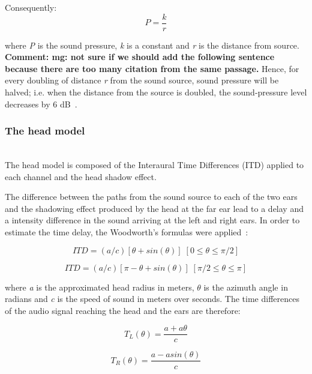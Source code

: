 \documentclass[journal]{IEEEtran}
\begin{document}
Consequently:
\begin{equation}\label{eq:soundpressure}
P = \frac{k}{r}
\end{equation}

where \textit{P} is the sound pressure, \textit{k} is a constant and \textit{r} is the distance from source.\\

\textbf{Comment: mg: not sure if we should add the following sentence because there are too many citation from the same passage.}
Hence, for every doubling of distance \textit{r} from the sound source, sound pressure will be halved; i.e. when the distance from the source is doubled, the sound-pressure level decreases by 6 dB~\cite{everest2009master}.

\subsubsection{The head model}~\\
The head model is composed of the Interaural Time Differences (ITD) applied to each channel and the head shadow effect.

The difference between the paths from the sound source to each of the two ears and the shadowing effect produced by the head at the far ear lead to a delay and a intensity difference in the sound arriving at the left and right ears.
In order to estimate the time delay, the Woodworth's formulas were applied~\cite{Woodworth}: 

\begin{equation}\label{eq:ITDfront}
ITD = (a/c)[\theta + sin(\theta)] \; [0 \leq \theta \leq \pi/2]
\end{equation}

\begin{equation}\label{eq:ITDback}
ITD = (a/c)[\pi - \theta + sin(\theta)] \; [\pi/2 \leq \theta \leq \pi]
\end{equation}

where \textit{a} is the approximated head radius in meters, $\theta$ is the azimuth angle in radians and \textit{c} is the speed of sound in meters over seconds. The time differences of the audio signal reaching the head and the ears are therefore:

\begin{equation}\label{eq:ITDL}
T_{L} (\theta) = \frac{a+a\theta}{c}
\end{equation}

\begin{equation}\label{eq:ITDR}
T_{R} (\theta) = \frac{a-a sin(\theta)}{c}
\end{equation}
\end{document}
